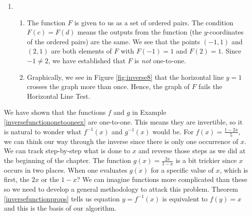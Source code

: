 {\begin{enumerate}
\begin{enumerate}
\end{enumerate}


\item  \begin{enumerate} \item The function $F$ is given to us as a set of ordered pairs.  The condition $F(c)=F(d)$ means the outputs from the function (the $y$-coordinates of the ordered pairs) are the same.  We see that the points $(-1,1)$ and $(2,1)$ are both elements of $F$ with $F(-1)=1$ and $F(2) = 1$.  Since $-1 \neq 2$, we have established that $F$ is \textit{not} one-to-one.

\item  Graphically, we see in Figure \ref{fig:inverse8} that the horizontal line $y=1$ crosses the graph more than once.  Hence, the graph of $F$ fails the Horizontal Line Test.

\end{enumerate}

\end{enumerate}

}

\medskip

We have shown that the functions $f$ and $g$ in Example \ref{inversefunctiononetooneex} are one-to-one.  This means they are invertible, so it is natural to wonder what $f^{-1}(x)$ and $g^{-1}(x)$ would be.  For $f(x) =  \frac{1-2x}{5}$, we can think our way through the inverse since there is only one occurrence of $x$. We can track step-by-step what is done to $x$ and reverse those steps as we did at the beginning of the chapter.  The function $g(x) = \frac{2x}{1-x}$ is a bit trickier since $x$ occurs in two places.  When one evaluates $g(x)$ for a specific value of $x$, which is first, the $2x$ or the $1-x$?  We can imagine functions more complicated than these so we need to develop a general methodology to attack this problem.  Theorem \ref{inversefunctionprops} tells us equation $y = f^{-1}(x)$ is equivalent to $f(y) = x$ and this is the basis of our algorithm.

\smallskip



